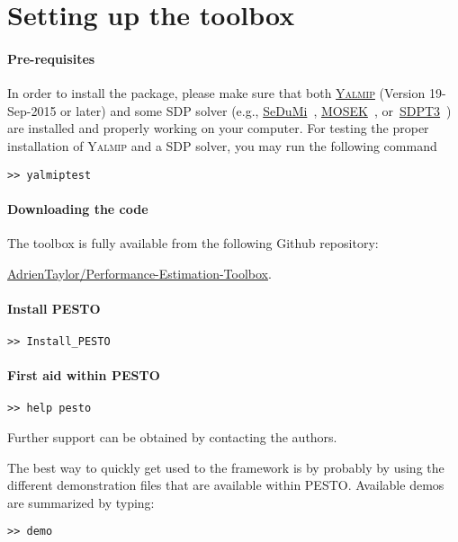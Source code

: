 \documentclass[11pt,a4paper]{article}
\newcommand{\pesto}{{PESTO }}
\begin{document}
\section{Setting up the toolbox}		%


\paragraph{Pre-requisites} In order to install the package, please make sure that both \href{https://yalmip.github.io/}{\textsc{Yalmip}} (Version 19-Sep-2015 or later) and some SDP solver (e.g., \href{http://sedumi.ie.lehigh.edu/}{SeDuMi}~\cite{Article:Sedumi}, \href{https://mosek.com/}{MOSEK}~\cite{Article:Mosek}, or~\href{http://www.math.nus.edu.sg/~mattohkc/sdpt3.html}{SDPT3}~\cite{Article:sdpt3}) are installed and properly working on your computer. For testing the proper installation of \textsc{Yalmip} and a SDP solver, you may run the following command
\begin{verbatim}
>> yalmiptest
\end{verbatim}
\paragraph{Downloading the code} The toolbox is fully available from the following {\sc Github} repository: \begin{center}
\href{https://github.com/AdrienTaylor/Performance-Estimation-Toolbox}{\sc AdrienTaylor/Performance-Estimation-Toolbox}.\\
\end{center}

\paragraph{Install \pesto}
\begin{verbatim}
>> Install_PESTO
\end{verbatim}

\paragraph{First aid within \pesto}
\begin{verbatim}
>> help pesto
\end{verbatim}
Further support can be obtained by contacting the authors.

The best way to quickly get used to the framework is by probably by using the different demonstration files that are available within PESTO. Available demos are summarized by typing:
\begin{verbatim}
>> demo
\end{verbatim}
\end{document}
